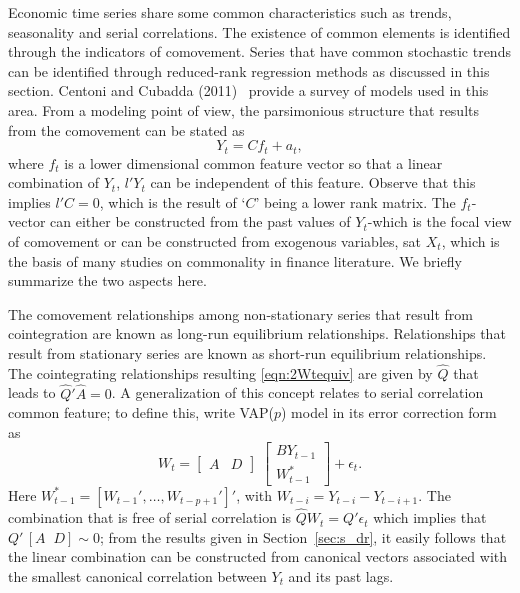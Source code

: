 Economic time series share some common characteristics such as trends, seasonality and serial correlations. The existence of common elements is identified through the indicators of comovement. Series that have common stochastic trends can be identified through reduced-rank regression methods as discussed in this section. Centoni and Cubadda (2011)~\cite{centoni} provide a survey of models used in this area. From a modeling point of view, the parsimonious structure that results from the comovement can be stated as
	\begin{equation} \label{eqn:discyt}
	Y_t= Cf_t + a_t,
	\end{equation}  
where $f_t$ is a lower dimensional common feature vector so that a linear combination of $Y_t$, $l' Y_t$ can be independent of this feature. Observe that this implies $l'C=0$, which is the result of `$C$' being a lower rank matrix. The $f_t$-vector can either be constructed from the past values of $Y_t$-which is the focal view of comovement or can be constructed from exogenous variables, sat $X_t$, which is the basis of many studies on commonality in finance literature. We briefly summarize the two aspects here. 


The comovement relationships among non-stationary series that result from cointegration are known as long-run equilibrium relationships. Relationships that result from stationary series are known as short-run equilibrium relationships. The cointegrating relationships resulting \eqref{eqn:2Wtequiv} are given by $\hat{Q}$ that leads to $\hat{Q}' \hat{A}=0$. A generalization of this concept relates to serial correlation common feature; to define this, write VAP($p$) model in its error correction form as
	\begin{equation} \label{eqn:2WteqAD}
	W_t=  \begin{bmatrix} A & D \end{bmatrix} \; \begin{bmatrix} BY_{t-1} \\ W_{t-1}^* \end{bmatrix} + \epsilon_t.
	\end{equation}
Here $W_{t-1}^*= [W_{t-1}', \ldots, W_{t-p+1}']'$, with $W_{t-i}= Y_{t-i} - Y_{t-i+1}$. The combination that is free of serial correlation is $\hat{Q} W_t= Q' \epsilon_t$ which implies that $Q' \,[A \;\; D] \sim 0$; from the results given in Section~\ref{sec:s_dr}, it easily follows that the linear combination can be constructed from canonical vectors associated with the smallest canonical correlation between $Y_t$ and its past lags.



